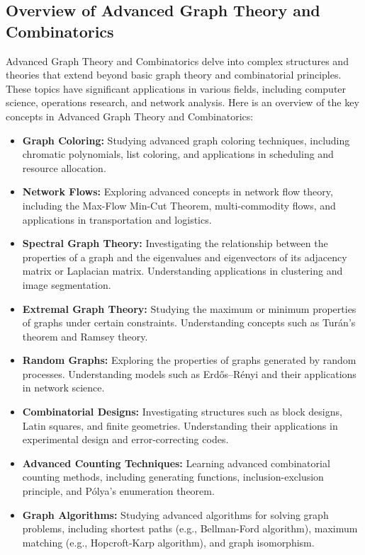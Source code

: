 \documentclass[openany]{book}
\begin{document}
\subsection{Overview of Advanced Graph Theory and Combinatorics}
Advanced Graph Theory and Combinatorics delve into complex structures and theories that extend beyond basic graph theory and combinatorial principles. These topics have significant applications in various fields, including computer science, operations research, and network analysis. Here is an overview of the key concepts in Advanced Graph Theory and Combinatorics:
\begin{itemize}
    \item \textbf{Graph Coloring:} Studying advanced graph coloring techniques, including chromatic polynomials, list coloring, and applications in scheduling and resource allocation.
    \item \textbf{Network Flows:} Exploring advanced concepts in network flow theory, including the Max-Flow Min-Cut Theorem, multi-commodity flows, and applications in transportation and logistics.
    \item \textbf{Spectral Graph Theory:} Investigating the relationship between the properties of a graph and the eigenvalues and eigenvectors of its adjacency matrix or Laplacian matrix. Understanding applications in clustering and image segmentation.
    \item \textbf{Extremal Graph Theory:} Studying the maximum or minimum properties of graphs under certain constraints. Understanding concepts such as Turán's theorem and Ramsey theory.
    \item \textbf{Random Graphs:} Exploring the properties of graphs generated by random processes. Understanding models such as Erdős–Rényi and their applications in network science.
    \item \textbf{Combinatorial Designs:} Investigating structures such as block designs, Latin squares, and finite geometries. Understanding their applications in experimental design and error-correcting codes.
    \item \textbf{Advanced Counting Techniques:} Learning advanced combinatorial counting methods, including generating functions, inclusion-exclusion principle, and Pólya's enumeration theorem.
    \item \textbf{Graph Algorithms:} Studying advanced algorithms for solving graph problems, including shortest paths (e.g., Bellman-Ford algorithm), maximum matching (e.g., Hopcroft-Karp algorithm), and graph isomorphism.

\end{itemize}
\end{document}
